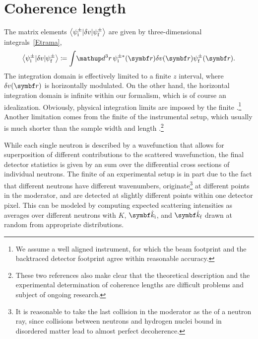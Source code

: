 %


\section{Coherence length}\label{Scoherlen}

%
The matrix elements $\left\langle \psi^\pm_{\text{i}}|\delta v|\psi^\pm_{\text{f}}\right\rangle$
are given by three-dimensional integrals~\cref{Etrama},
\begin{equation}\label{Etrama3}
  \bra \psi_\ti^\pm|\delta v|\psi_\tf^\pm\ket
  \coloneqq  \int\!\d^3r\, \psi^{\pm*}_\ti(\r)\delta v(\r)\psi^\pm_\tf(\r).
\end{equation}
The integration domain is effectively limited to a finite $z$ interval,
where $\delta v(\r)$ is horizontally modulated.
On the other hand, the horizontal integration domain is infinite
within our formalism,
which is of course an idealization.
Obviously, physical integration limits are imposed by the finite
%
.\footnote
{We assume a well aligned instrument,
for which the beam footprint and the backtraced detector footprint
%
%
%
agree within reasonable accuracy.}
Another limitation comes from the finite 
of the instrumental setup,
which usually is much shorter than the sample width and length
\cite{HaPR10,MaMM14}.\footnote
{These two references also make clear that
  the theoretical description and the experimental determination of
  coherence lengths are difficult problems and subject of ongoing research.}

While each single neutron is described by a wavefunction
that allows for  superposition of
different contributions to the scattered wavefunction,
the final detector statistics
%
is given by an  sum
over the differential cross sections of individual neutrons.
The finite 
%
of an experimental setup is in part due to the fact that
different neutrons have different wavenumbers,
originate\footnote
{It is reasonable to take the last collision in the moderator
  as the  of a neutron ray,
  since collisions between neutrons and hydrogen nuclei bound in
  disordered matter lead to almost perfect decoherence.}
at different points in the moderator,
and are detected at slightly different points within one detector pixel.
This can be modeled by computing expected scattering intensities as
averages over different neutrons with
$K$, $\v{\hat k}_\ti$, and $\v{\hat k}_\tf$ drawn at random
from appropriate distributions.

